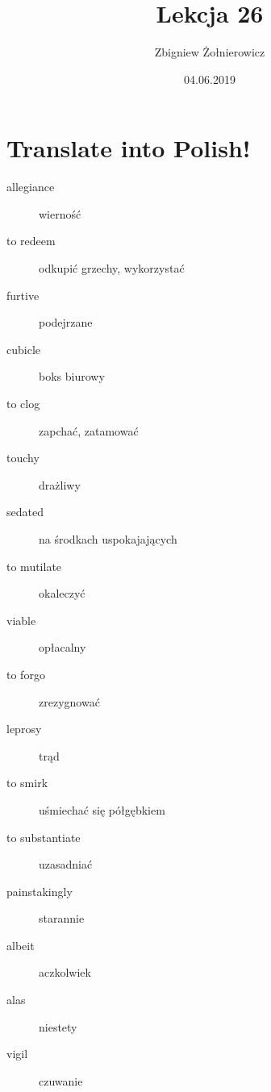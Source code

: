 \documentclass[a4paper]{article}
\begin{document}
\title{{\huge Lekcja 26}}
\author{Zbigniew Żołnierowicz}
\date{04.06.2019}
\maketitle
\section{Translate into Polish!}
\begin{description}
    \item[allegiance] wierność
    \item[to redeem] odkupić grzechy, wykorzystać
    \item[furtive] podejrzane
    \item[cubicle] boks biurowy
    \item[to clog] zapchać, zatamować
    \item[touchy] drażliwy
    \item[sedated] na środkach uspokajających
    \item[to mutilate] okaleczyć
    \item[viable] opłacalny
    \item[to forgo] zrezygnować
    \item[leprosy] trąd
    \item[to smirk] uśmiechać się półgębkiem
    \item[to substantiate] uzasadniać
    \item[painstakingly] starannie
    \item[albeit] aczkolwiek
    \item[alas] niestety
    \item[vigil] czuwanie
\end{description}
\end{document}
